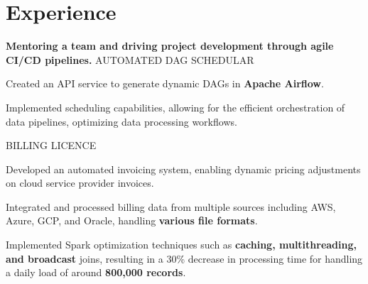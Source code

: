 \documentclass[]{deedy-resume-openfont}
\begin{document}
\begin{minipage}[t]{0.33\textwidth}
\sectionsep






%
%

\end{minipage} 
\hfill
\begin{minipage}[t]{0.66\textwidth} 

\section{Experience}

\vspace{\topsep}

\textbf{Mentoring a team and driving project development through agile CI/CD pipelines.}
{AUTOMATED DAG SCHEDULAR}
\vspace{\topsep} %
\begin{tightemize}
\item Created an API service to generate dynamic DAGs in \textbf{Apache Airflow}.
\item Implemented scheduling capabilities, allowing for the efficient orchestration of data pipelines, optimizing data processing workflows.
\end{tightemize}

\vspace{\topsep}
{BILLING LICENCE}
\begin{tightemize}
\item Developed an automated invoicing system, enabling dynamic pricing adjustments on cloud service provider invoices.
\item Integrated and processed billing data from multiple sources including AWS, Azure, GCP, and Oracle, handling \textbf{various file formats}.
\item Implemented Spark optimization techniques such as \textbf{caching, multithreading, and broadcast} joins, resulting in a 30\% decrease in processing time for handling a daily load of around \textbf{800,000 records}.
\end{tightemize}


\end{minipage}
\end{document}
